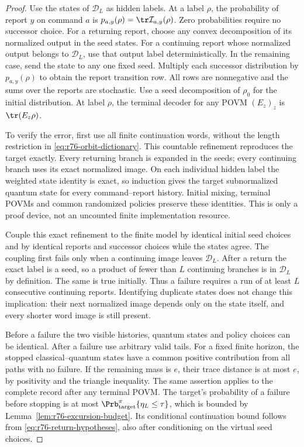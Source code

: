 \begin{proof}
Use the states of $\mathscr D_L$ as hidden labels.  At a label $\rho$,
the probability of report $y$ on command $a$ is
$p_{a,y}(\rho)=\tr\mathcal I_{a,y}(\rho)$.  Zero probabilities require
no successor choice.  For a returning report, choose any convex
decomposition of its normalized output in the seed states.  For a
continuing report whose normalized output belongs to $\mathscr D_L$,
use that output label deterministically.  In the remaining case, send
the state to any one fixed seed.  Multiply each successor distribution
by $p_{a,y}(\rho)$ to obtain the report transition row.  All rows are
nonnegative and the sums over the reports are stochastic.  Use a seed
decomposition of $\rho_0$ for the initial distribution.  At label $\rho$,
the terminal decoder for any POVM $(E_z)_z$ is $\tr(E_z\rho)$.

To verify the error, first use all finite continuation words, without
the length restriction in \eqref{eq:r76-orbit-dictionary}.  This countable
refinement reproduces the target exactly.  Every returning branch is
expanded in the seeds; every continuing branch uses its exact normalized
image.  On each individual hidden label the weighted state identity is
exact, so induction gives the target subnormalized quantum state for
every command--report history.  Initial mixing, terminal POVMs and common
randomized policies preserve these identities.  This is only a proof
device, not an uncounted finite implementation resource.

Couple this exact refinement to the finite model by identical initial
seed choices and by identical reports and successor choices while the
states agree.  The coupling first fails only when a continuing image
leaves $\mathscr D_L$.  After a return the exact label is a seed, so a
product of fewer than $L$ continuing branches is in $\mathscr D_L$ by
definition.  The same is true initially.  Thus a failure requires a run
of at least $L$ consecutive continuing reports.  Identifying duplicate
states does not change this implication: their next normalized image
depends only on the state itself, and every shorter word image is still
present.

Before a failure the two visible histories, quantum states and policy
choices can be identical.  After a failure use arbitrary valid tails.
For a fixed finite horizon, the stopped classical--quantum states have
a common positive contribution from all paths with no failure.  If the
remaining mass is $e$, their trace distance is at most $e$, by positivity
and the triangle inequality.  The same assertion applies to the complete
record after any terminal POVM.  The target's probability of a failure
before stopping is at most $\Prb_{\rm target}^{\pi}\{\eta_L\le\tau\}$,
which is bounded by Lemma~\ref{lem:r76-excursion-budget}.  Its conditional
continuation bound follows from \eqref{eq:r76-return-hypotheses}, also
after conditioning on the virtual seed choices.


\end{proof}
